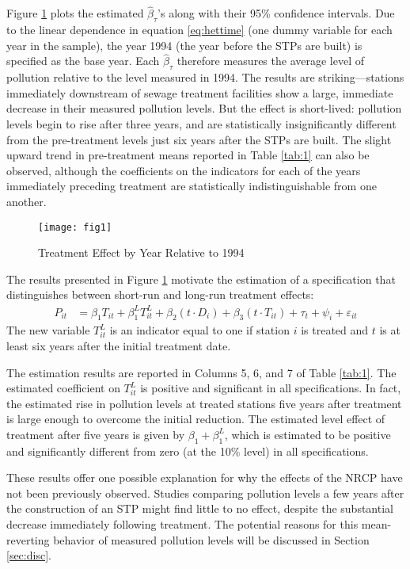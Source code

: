 \documentclass[12pt]{article}
\newcommand{\e}{\varepsilon}
\begin{document}
Figure \ref{fig:1} plots the estimated $\hat{\beta}_\tau$'s along with their 95\% confidence intervals. Due to the linear dependence in equation \eqref{eq:hettime} (one dummy variable for each year in the sample), the year 1994 (the year before the STPs are built) is specified as the base year. Each $\hat{\beta}_\tau$ therefore measures the average level of pollution relative to the level measured in 1994. The results are striking---stations immediately downstream of sewage treatment facilities show a large, immediate decrease in their measured pollution levels. But the effect is short-lived: pollution levels begin to rise after three years, and are statistically insignificantly different from the pre-treatment levels just six years after the STPs are built. The slight upward trend in pre-treatment means reported in Table \ref{tab:1} can also be observed, although the coefficients on the indicators for each of the years immediately preceding treatment are statistically indistinguishable from one another. 

\begin{figure}[t] \centering 
	\texttt{[image: fig1]}
	\caption{Treatment Effect by Year Relative to 1994}
	\label{fig:1}
\end{figure}

The results presented in Figure \ref{fig:1} motivate the estimation of a specification that distinguishes between short-run and long-run treatment effects:
\begin{align}
  	P_{it} &= \beta_1 T_{it} + \beta_1^L T_{it}^{L}+ \beta_2 (t\cdot D_{i}) + \beta_3 (t\cdot T_{it}) + \tau_t + \psi_i + \e_{it} \label{eq:post5}
\end{align}
The new variable $T_{it}^{L}$ is an indicator equal to one if station $i$ is treated and $t$ is at least six years after the initial treatment date. 

The estimation results are reported in Columns 5, 6, and 7 of Table \ref{tab:1}. The estimated coefficient on $T^L_{it}$ is positive and significant in all specifications. In fact, the estimated rise in pollution levels at treated stations five years after treatment is large enough to overcome the initial reduction. The estimated level effect of treatment after five years is given by $\beta_1 + \beta_1^L$, which is estimated to be positive and significantly different from zero (at the 10\% level) in all specifications. 

These results offer one possible explanation for why the effects of the NRCP have not been previously observed. Studies comparing pollution levels a few years after the construction of an STP might find little to no effect, despite the substantial decrease immediately following treatment. The potential reasons for this mean-reverting behavior of measured pollution levels will be discussed in Section \ref{sec:disc}.
\end{document}
